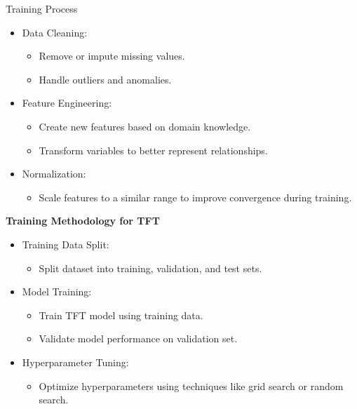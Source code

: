
\begin{frame}{Training Process}
	\begin{itemize}
		\item Data Cleaning:
		\begin{itemize}
			\item Remove or impute missing values.
			\item Handle outliers and anomalies.
		\end{itemize}
		
		\item Feature Engineering:
		\begin{itemize}
			\item Create new features based on domain knowledge.
			\item Transform variables to better represent relationships.
		\end{itemize}
		
		\item Normalization:
		\begin{itemize}
			\item Scale features to a similar range to improve convergence during training.
		\end{itemize}
	\end{itemize}	
\end{frame}

	\begin{frame}
	\textbf{Training Methodology for TFT}
	\begin{itemize}
		\item Training Data Split:
		\begin{itemize}
			\item Split dataset into training, validation, and test sets.
		\end{itemize}
		
		\item Model Training:
		\begin{itemize}
			\item Train TFT model using training data.
			\item Validate model performance on validation set.
		\end{itemize}
		
		\item Hyperparameter Tuning:
		\begin{itemize}
			\item Optimize hyperparameters using techniques like grid search or random search.
		\end{itemize}
	\end{itemize}	
\end{frame}

